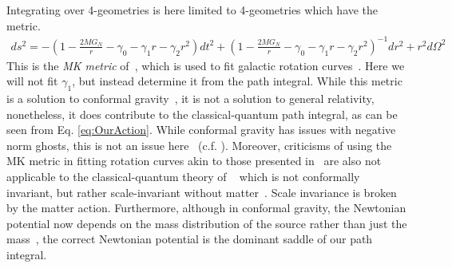 \documentclass[aps,pra,amsmath,amssymb,amsthm,floatfix,nofootinbib,notitlepage,superscriptaddress,10pt]{revtex4-2}
\begin{document}
Integrating over 4-geometries is here limited to 4-geometries which have the metric.
\begin{align}
   ds^2 =-\left(1-\frac{2MG_N}{r}-\gamma_0-\gamma_1 r-\gamma_2 r^2\right)dt^2+\left(1-\frac{2MG_N}{r}-\gamma_0-\gamma_1 r-\gamma_2 r^2\right)^{-1}dr^2+r^2d\Omega^2
   \label{eq: stochastic Schwar}
\end{align} 
This is the {\it MK metric} of~\cite{riegert1984birkhoff,mannheim1994newtonian}, which is used to fit galactic rotation curves~\cite{mannheim1994newtonian,mannheim1997galactic,mannheim1989exact,mannheim2012fitting,O_Brien_2018}.  Here we will not fit $\gamma_1$, but instead determine it from the path integral. While this metric is a solution to conformal gravity~\cite{riegert1984birkhoff}, it is not a solution to general relativity, nonetheless, it does contribute to the classical-quantum path integral, as can be seen from Eq. \eqref{eq:OurAction}.  While conformal gravity has issues with negative norm ghosts, this is not an issue here~\cite{grudka2023renormalisable} (c.f. \cite{buccio2024physical,mannheim2020ghost,holdom2016quadratic,donoghue2021quadratic, anselmi2017quantum, salvio2018new, salvio2022bicep}). Moreover, criticisms of using the MK metric in fitting rotation curves akin to those presented in~\cite{horne2016conformal,hobson2021conformal,hobson2022conformally} are also not applicable to the classical-quantum theory of ~\cite{oppenheim2018post,oppenheim2023covariant} which is not conformally invariant, but rather scale-invariant without matter~\cite{grudka2023renormalisable}.  Scale invariance is broken by the matter action. Furthermore, although in conformal gravity, the Newtonian potential now depends on the mass distribution of the source rather than just the mass~\cite{Yoon_2013}, the correct Newtonian potential is the dominant saddle of our path integral.
\end{document}

